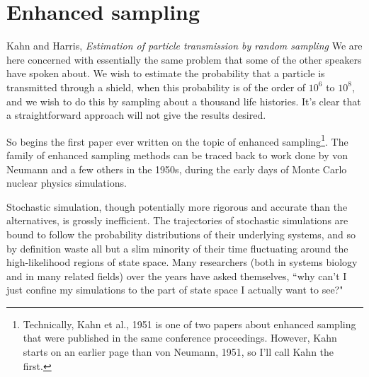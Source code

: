 


\section{Enhanced sampling}

\begin{chapquote}{Kahn and Harris, \textit{Estimation of particle transmission by random sampling}\supercite{Kahn:1951es}}
We are here concerned with essentially the same problem that some of the other speakers have spoken about. We wish to estimate the probability that a particle is transmitted through a shield, when this probability is of the order of $10^6$ to $10^8$, and we wish to do this by sampling about a thousand life histories. It's clear that a straightforward approach will not give the results desired.
\end{chapquote}

So begins the first paper ever written on the topic of enhanced sampling\footnote{Technically, Kahn et al., 1951\supercite{Kahn:1951es} is one of two papers about enhanced sampling that were published in the same conference proceedings. However, Kahn starts on an earlier page than von Neumann, 1951\supercite{vonNeumann:1951fe}, so I'll call Kahn the first.}. The family of enhanced sampling methods can be traced back to work done by von Neumann\supercite{vonNeumann:1951fe} and a few others\supercite{Kahn:1953az,Forsythe:1972cf} in the 1950s, during the early days of Monte Carlo nuclear physics simulations.

Stochastic simulation, though potentially more rigorous and accurate than the alternatives, is grossly inefficient. The trajectories of stochastic simulations are bound to follow the probability distributions of their underlying systems, and so by definition waste all but a slim minority of their time fluctuating around the high-likelihood regions of state space. Many researchers (both in systems biology and in many related fields\supercite{Huber:1996dn,Dellago:1998kw,vanErp:2005jua,Bernardi:2015ij}) over the years have asked themselves, ``why can't I just confine my simulations to the part of state space I actually want to see?"

